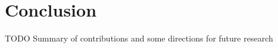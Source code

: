     \section{Conclusion}
        TODO
        Summary of contributions and some directions for future research
    








